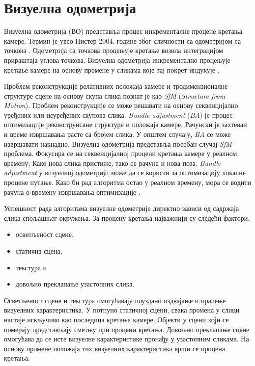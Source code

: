 \documentclass[12pt]{article}
\begin{document}
\newpage
\section{Визуелна одометрија}
Визуелна одометрија (ВО) представља процес инкременталне процене кретања
камере. Термин је увео Нистер 2004. године због сличности са одометријом са
точкова \cite{nister2004visual, scaramuzza2011visual}. Одометрија са точкова
процењује кретање возила интеграцијом прираштаја углова точкова. Визуелна
одометрија инкрементално процењује кретање камере на основу промене у сликама
које тај покрет индукује \cite{scaramuzza2011visual}.

Проблем реконструкције релативних положаја камере и тродимензионалне структуре
сцене на основу скупа слика познат је као \textit{SfM} (\textit{Structure from
	Motion}). Проблем реконструкције се може решавати на основу секвенцијално
уређених или неуређених скупова слика. \textit{Bundle adjustment} (\textit{BA})
је процес оптимизације реконструисане структуре и положаја камере. Рачунски је
захтеван и време извршавања расте са бројем слика. У општем случају,
\textit{BA} се може извршавати накнадно. Визуелна одометрија представља посебан
случај \textit{SfM} проблема. Фокусира се на секвенцијалној процени кретања
камере у реалном времену. Како нова слика пристиже, тако се рачуна и нова поза.
\textit{Bundle adjustment} у визуелној одометрији може да се користи за
оптимизацију локалне процене путање. Како би рад алгоритма остао у реалном
времену, мора се водити рачуна о времену извршавања оптимизације
\cite{nister2004visual}.

Успешност рада алгоритама визуелне одометрије директно зависи од садржаја слика
спољашњег окружења. За процену кретања најважнији су следећи фактори:
\begin{itemize}
	\item осветљеност сцене,
	\item статична сцена,
	\item текстура и
	\item довољно преклапање узастопних слика.
\end{itemize}

Осветљеност сцене и текстура омогућавају поуздано издвајање и праћење визуелних
карактеристика. У потпуно статичној сцени, свака промена у слици настаје
искључиво као последица кретања камере. Објекти у сцени који се померају
представљају сметњу при процени кретања. Довољно преклапање сцене омогућава да
се исте визуелне карактеристике пронађу у узастопним сликама. На основу промене
положаја тих визуелних карактеристика врши се процена кретања.
\end{document}
